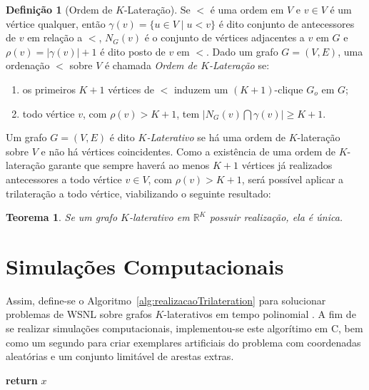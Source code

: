 \documentclass[a0,portrait]{a0poster}
\theoremstyle{plain}
\newtheorem{teorema2}{Teorema}[]
\theoremstyle{definition}
\newtheorem{definicao}{Definição}[]
\begin{document}
\begin{multicols}{2}
\begin{definicao}[Ordem de $K$-Lateração]
	Se $<$ é uma ordem em $V$ e $v\in V$ é um vértice qualquer, então $\gamma(v) = \{u\in V \;|\; u<v \}$ é dito conjunto de antecessores de $v$ em relação a $<$, $N_G(v)$ é o conjunto de vértices adjacentes a $v$ em $G$ e $\rho(v) = |\gamma(v)|+1$ é dito posto de $v$ em $<$. Dado um grafo $G=(V,E)$, uma ordenação $<$ sobre $V$ é chamada \textit{Ordem de $K$-Lateração} se:
	
	\begin{enumerate}
		\vspace{-0.2cm}
		\item os primeiros $K+1$ vértices de $<$ induzem um $(K+1)$-clique $G_o$ em $G$;
		\vspace{-0.2cm}
		\item todo vértice $v$, com $\rho(v) > K+1$, tem $\lvert N_G(v) \bigcap \gamma(v)\rvert \geq K+1$.
	\end{enumerate}
\end{definicao}

\noindent Um grafo $G = (V,E)$ é dito \textit{$K$-Laterativo} se há uma ordem de $K$-lateração sobre $V$ e não há vértices coincidentes. Como a existência de uma ordem de $K$-lateração garante que sempre haverá ao menos $K+1$ vértices já realizados antecessores a todo vértice $v \in V$, com $\rho(v) > K+1$, será possível aplicar a trilateração a todo vértice, viabilizando o seguinte resultado:

\begin{teorema2}
	Se um grafo $K$-laterativo em $\mathbb{R}^K$ possuir realização, ela é única.
\end{teorema2}

\vspace{-1cm}
\section*{Simulações Computacionais}
\vspace{-0.7cm}
Assim, define-se o Algoritmo~\ref{alg:realizacaoTrilateration} para so\-lu\-cio\-nar problemas de WSNL sobre grafos $K$-laterativos em tempo polinomial \cite{libertiEDG}. A fim de se realizar simulações computacionais, implementou-se este algorítimo em C, bem como um segundo para criar exemplares artificiais do problema com coordenadas aleatórias e um conjunto limitável de arestas extras.

\vspace{0.5cm}
\begin{algorithm}[H]
	\label{alg:realizacaoTrilateration}
	\textbf{return} $x$\;
	\caption{$x =$ RealizacaoIterativa$(G,d, K, x)$, adaptado de \cite{libertiEDG}}
\end{algorithm}
\vspace{0.5cm}


\end{multicols}
\end{document}
